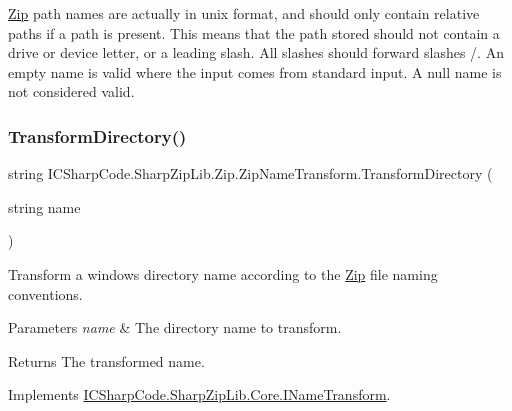 \hyperlink{namespace_i_c_sharp_code_1_1_sharp_zip_lib_1_1_zip}{Zip} path names are actually in unix format, and should only contain relative paths if a path is present. This means that the path stored should not contain a drive or device letter, or a leading slash. All slashes should forward slashes \textquotesingle{}/\textquotesingle{}. An empty name is valid where the input comes from standard input. A null name is not considered valid. \mbox{\label{class_i_c_sharp_code_1_1_sharp_zip_lib_1_1_zip_1_1_zip_name_transform_ac5ce9344a3eed6817a8e8a67e9d12bfe}} 
\subsubsection{\texorpdfstring{Transform\+Directory()}{TransformDirectory()}}
{\footnotesize\ttfamily string I\+C\+Sharp\+Code.\+Sharp\+Zip\+Lib.\+Zip.\+Zip\+Name\+Transform.\+Transform\+Directory (\begin{DoxyParamCaption}\item[{string}]{name }\end{DoxyParamCaption})\hspace{0.3cm}{\ttfamily [inline]}}



Transform a windows directory name according to the \hyperlink{namespace_i_c_sharp_code_1_1_sharp_zip_lib_1_1_zip}{Zip} file naming conventions. 


\begin{DoxyParams}{Parameters}
{\em name} & The directory name to transform.\\
\hline
\end{DoxyParams}
\begin{DoxyReturn}{Returns}
The transformed name.
\end{DoxyReturn}


Implements \hyperlink{interface_i_c_sharp_code_1_1_sharp_zip_lib_1_1_core_1_1_i_name_transform_a8052780160a8d458799e014aa8308c78}{I\+C\+Sharp\+Code.\+Sharp\+Zip\+Lib.\+Core.\+I\+Name\+Transform}.

